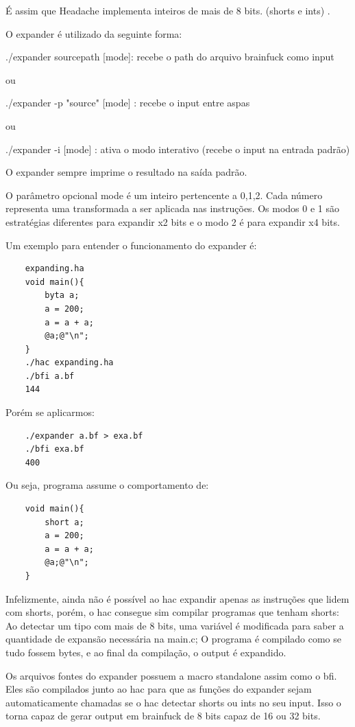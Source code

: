É assim que Headache implementa inteiros de mais de 8 bits. (shorts e ints) .

O expander é utilizado da seguinte forma:

./expander sourcepath [mode]: recebe o path do arquivo brainfuck como input 

ou

./expander -p "source" [mode] : recebe o input entre aspas

ou

./expander -i [mode] : ativa o modo interativo (recebe o input na entrada padrão)

O expander sempre imprime o resultado na saída padrão. 

O parâmetro opcional mode é um inteiro pertencente a {0,1,2}. Cada número representa uma transformada a ser aplicada nas instruções. Os modos 0 e 1 são estratégias diferentes para expandir x2 bits e o modo 2 é para expandir x4 bits.

Um exemplo para entender o funcionamento do expander é:

\begin{verbatim}
    expanding.ha
    void main(){
        byta a;
        a = 200;
        a = a + a;
        @a;@"\n";
    }
    ./hac expanding.ha 
    ./bfi a.bf
    144
\end{verbatim}

Porém se aplicarmos:

\begin{verbatim}
    ./expander a.bf > exa.bf
    ./bfi exa.bf
    400
\end{verbatim}

Ou seja, programa assume o comportamento de:

\begin{verbatim}
    void main(){
        short a;
        a = 200;
        a = a + a;
        @a;@"\n";
    }
\end{verbatim}

Infelizmente, ainda não é possível ao hac expandir apenas as instruções que lidem com shorts, porém, o hac consegue sim compilar programas que tenham shorts: Ao detectar um tipo com mais de 8 bits, uma variável é modificada para saber a quantidade de expansão necessária na main.c; O programa é compilado como se tudo fossem bytes, e  ao final da compilação, o output é expandido.

Os arquivos fontes do expander possuem a macro standalone assim como o bfi. Eles são compilados junto ao hac para que as funções do expander sejam automaticamente chamadas se o hac detectar shorts ou ints no seu input. Isso o torna capaz de gerar output em brainfuck de 8 bits capaz de 16 ou 32 bits.

